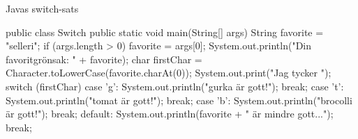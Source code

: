 


%
%


\begin{Slide}{Javas switch-sats}

\begin{CodeSmall}[language=Java]
public class Switch {
    public static void main(String[] args) {
        String favorite = "selleri";
        if (args.length > 0) {
            favorite = args[0];
        }
        System.out.println("Din favoritgrönsak: " + favorite);
        char firstChar = Character.toLowerCase(favorite.charAt(0));
        System.out.print("Jag tycker ");
        switch (firstChar) {
        case 'g': 
            System.out.println("gurka är gott!");
            break;
        case 't': 
            System.out.println("tomat är gott!");
            break;
        case 'b': 
            System.out.println("brocolli är gott!");
            break;
        default:
            System.out.println(favorite + " är mindre gott...");
            break;
        }
    }
}
\end{CodeSmall}
\end{Slide}












